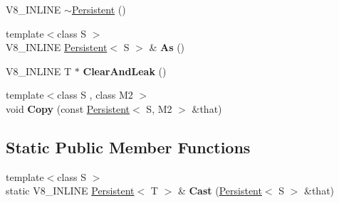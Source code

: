 \begin{DoxyCompactItemize}
\item 
V8\+\_\+\+I\+N\+L\+I\+N\+E \hyperlink{classv8_1_1_persistent_a7d4d2bebfe3919e447e22adc15464e25}{$\sim$\+Persistent} ()
\item 
\hypertarget{classv8_1_1_persistent_a8d2c96e559ac88f6201d98cb2a626808}{}{\footnotesize template$<$class S $>$ }\\V8\+\_\+\+I\+N\+L\+I\+N\+E \hyperlink{classv8_1_1_persistent}{Persistent}$<$ S $>$ \& {\bfseries As} ()\label{classv8_1_1_persistent_a8d2c96e559ac88f6201d98cb2a626808}

\item 
\hypertarget{classv8_1_1_persistent_ab114b358e4eb09025ef3ca9152e684a3}{}V8\+\_\+\+I\+N\+L\+I\+N\+E T $\ast$ {\bfseries Clear\+And\+Leak} ()\label{classv8_1_1_persistent_ab114b358e4eb09025ef3ca9152e684a3}

\item 
\hypertarget{classv8_1_1_persistent_ace50a178e3b772f75611e22e41fae974}{}{\footnotesize template$<$class S , class M2 $>$ }\\void {\bfseries Copy} (const \hyperlink{classv8_1_1_persistent}{Persistent}$<$ S, M2 $>$ \&that)\label{classv8_1_1_persistent_ace50a178e3b772f75611e22e41fae974}

\end{DoxyCompactItemize}
\subsection*{Static Public Member Functions}
\begin{DoxyCompactItemize}
\item 
\hypertarget{classv8_1_1_persistent_aa20fd9af0b410df9e887689ef97c28dd}{}{\footnotesize template$<$class S $>$ }\\static V8\+\_\+\+I\+N\+L\+I\+N\+E \hyperlink{classv8_1_1_persistent}{Persistent}$<$ T $>$ \& {\bfseries Cast} (\hyperlink{classv8_1_1_persistent}{Persistent}$<$ S $>$ \&that)\label{classv8_1_1_persistent_aa20fd9af0b410df9e887689ef97c28dd}

\end{DoxyCompactItemize}
